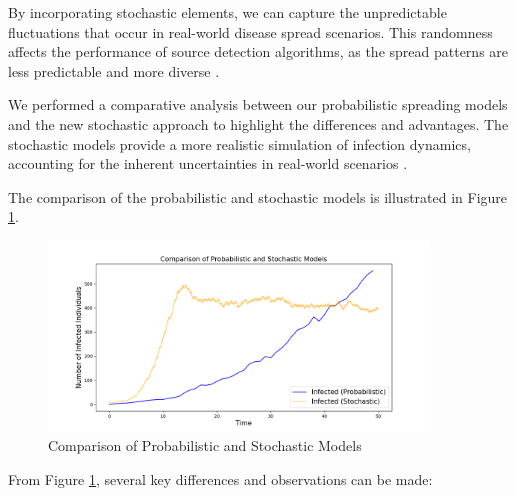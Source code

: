 By incorporating stochastic elements, we can capture the unpredictable fluctuations that occur in real-world disease spread scenarios. This randomness affects the performance of source detection algorithms, as the spread patterns are less predictable and more diverse \cite{britton2010, keeling2008}.

We performed a comparative analysis between our probabilistic spreading models and the new stochastic approach to highlight the differences and advantages. The stochastic models provide a more realistic simulation of infection dynamics, accounting for the inherent uncertainties in real-world scenarios \cite{allen2017, ball2016}.

The comparison of the probabilistic and stochastic models is illustrated in Figure \ref{fig:Comparison_Probabilistic_Stochastic}.

\begin{figure}[H]
    \centering
    \includegraphics[width=0.9\textwidth]{Comparison_Probabilistic_Stochastic Models.png}
    \caption{Comparison of Probabilistic and Stochastic Models}
    \label{fig:Comparison_Probabilistic_Stochastic}
\end{figure}

From Figure \ref{fig:Comparison_Probabilistic_Stochastic}, several key differences and observations can be made:

